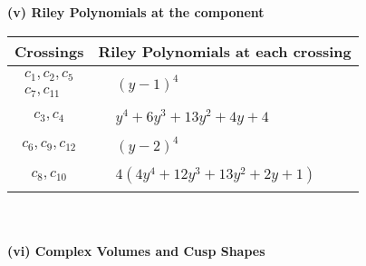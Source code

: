 \documentclass[1p]{elsarticle_modified}
\theoremstyle{definition}
\begin{document}
\newpage\renewcommand{\arraystretch}{1}
\flushleft \textbf{(v) Riley Polynomials at the component}\newline \\
\begin{tabular}{m{50pt}|m{274pt}}
Crossings & \hspace{64pt}Riley Polynomials at each crossing \\
\hline $$\begin{aligned}c_{1},c_{2},c_{5}\\c_{7},c_{11}\end{aligned}$$&$\begin{aligned}
&(y-1)^4
\end{aligned}$\\
\hline $$\begin{aligned}c_{3},c_{4}\end{aligned}$$&$\begin{aligned}
&y^4+6 y^3+13 y^2+4 y+4
\end{aligned}$\\
\hline $$\begin{aligned}c_{6},c_{9},c_{12}\end{aligned}$$&$\begin{aligned}
&(y-2)^4
\end{aligned}$\\
\hline $$\begin{aligned}c_{8},c_{10}\end{aligned}$$&$\begin{aligned}
&4(4 y^4+12 y^3+13 y^2+2 y+1)
\end{aligned}$\\
\hline
\end{tabular}\\~\\
\newpage\flushleft \textbf{(vi) Complex Volumes and Cusp Shapes}
\end{document}
